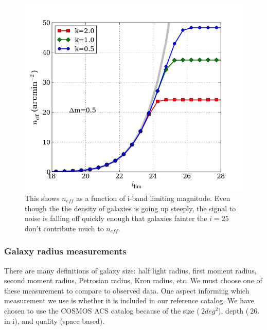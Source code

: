 \documentclass[]{article}
\begin{document}
\begin{figure}
\centering
\includegraphics[width=5in]{validation_figures/neff_m_ir.png}
\caption{This shows $n_{eff}$ as a function of i-band limiting magnitude.  Even though the the density of galaxies is going up steeply, the 
signal to noise is falling off quickly enough that galaxies fainter the $i=25$ don't contribute much to $n_{eff}$.\label{fig:neffvm}}
\end{figure}

\subsubsection{Galaxy radius measurements}
There are many definitions of galaxy size: half light radius, first moment radius, second moment radius, Petrosian radius, Kron radius, etc.
We must choose one of these measurement to compare to observed data.  One aspect informing which measurement we use is whether it is included 
in our reference catalog.  We have chosen to use the COSMOS ACS catalog \cite{cosmos} because of the size ($~2deg^2$), depth ($~26.$ in i), and
quality (space based).  
\end{document}
